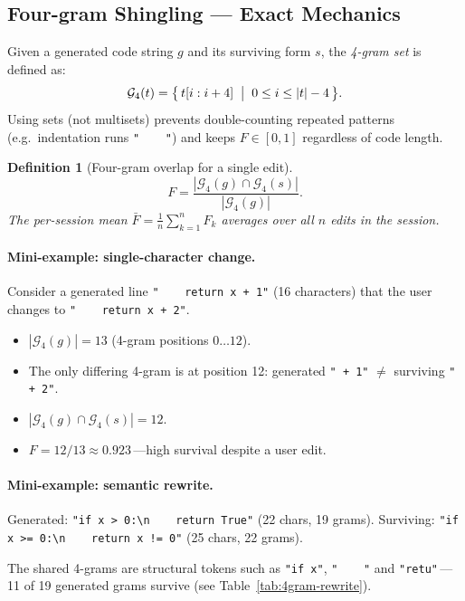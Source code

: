 \documentclass[11pt,a4paper]{article}
\newtheorem{definition}{Definition}
\begin{document}
\subsection{Four-gram Shingling --- Exact Mechanics}
\label{sec:edit-survival-4gram}

Given a generated code string $g$ and its surviving form $s$, the
\emph{4-gram set} is defined as:
\[
  \mathcal{G}_4(t) = \bigl\{\, t[i : i+4] \;\bigm|\; 0 \leq i \leq |t| - 4 \,\bigr\}.
\]
Using sets (not multisets) prevents double-counting repeated patterns
(e.g.\ indentation runs \verb|"    "|) and keeps $F \in [0,1]$ regardless of
code length.

\begin{definition}[Four-gram overlap for a single edit]
\[
  F = \frac{|\mathcal{G}_4(g) \cap \mathcal{G}_4(s)|}{|\mathcal{G}_4(g)|}.
\]
The per-session mean $\bar{F} = \tfrac{1}{n}\sum_{k=1}^{n} F_k$ averages over
all $n$ edits in the session.
\end{definition}

\paragraph{Mini-example: single-character change.}
Consider a generated line \texttt{"\ \ \ \ return x + 1"} (16 characters)
that the user changes to \texttt{"\ \ \ \ return x + 2"}.

\begin{itemize}
  \item $|\mathcal{G}_4(g)| = 13$ (4-gram positions $0\ldots 12$).
  \item The only differing 4-gram is at position 12:
        generated \texttt{" + 1"} $\neq$ surviving \texttt{" + 2"}.
  \item $|\mathcal{G}_4(g) \cap \mathcal{G}_4(s)| = 12$.
  \item $F = 12/13 \approx 0.923$\,---high survival despite a user edit.
\end{itemize}

\paragraph{Mini-example: semantic rewrite.}
Generated: \texttt{"if x > 0:\textbackslash n\ \ \ \ return True"} (22 chars, 19 grams).
Surviving: \texttt{"if x >= 0:\textbackslash n\ \ \ \ return x != 0"} (25 chars, 22 grams).

The shared 4-grams are structural tokens such as \texttt{"if x"}, \texttt{"\ \ \ \ "} and
\texttt{"retu"}\,---\,11 of 19 generated grams survive (see Table~\ref{tab:4gram-rewrite}).
\end{document}
